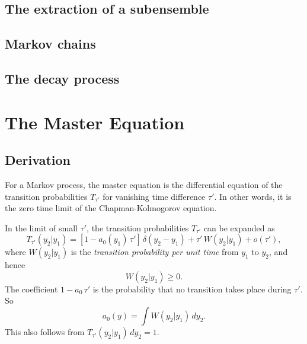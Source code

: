 \documentclass{book}
\numberwithin{equation}{section}
\theoremstyle{plain}
\theoremstyle{definition}
\theoremstyle{remark}
\theoremstyle{BoldStyle}
\numberwithin{exercise}{section}
\begin{document}
\section{The extraction of a subensemble}

\section{Markov chains}

\section{The decay process}


\chapter{The Master Equation}

\section{Derivation}

For a Markov process,
the master equation is the differential equation
of the transition probabilities $T_{\tau'}$
for vanishing time difference $\tau'$.
%
In other words,
it is the zero time limit of
the Chapman-Kolmogorov equation.


In the limit of small $\tau'$,
the transition probabilities $T_{\tau'}$ can be expanded as
%
\begin{equation}
  T_{\tau'}(y_2 | y_1)
  =
  \left[1 - a_0(y_1) \, \tau'\right] \, \delta(y_2 - y_1)
  +
  \tau' \, W(y_2 | y_1) + o(\tau'),
  \label{eq:transproba_smallt}
\end{equation}
%
where $W(y_2 | y_1)$ is the \emph{transition probability per unit time}
from $y_1$ to $y_2$,
and hence
%
\begin{equation}
  W(y_2 | y_1) \ge 0.
  \label{eq:W_positive}
\end{equation}
%
The coefficient $1-a_0\, \tau'$ is the probability that no transition takes place
during $\tau'$.  So
%
\begin{equation}
  a_0(y)
  =
  \int W(y_2 | y_1) \, dy_2.
  \label{eq:total_W}
\end{equation}
%
This also follows from $T_{\tau'}(y_2 | y_1) \, dy_2 = 1$.
\end{document}
